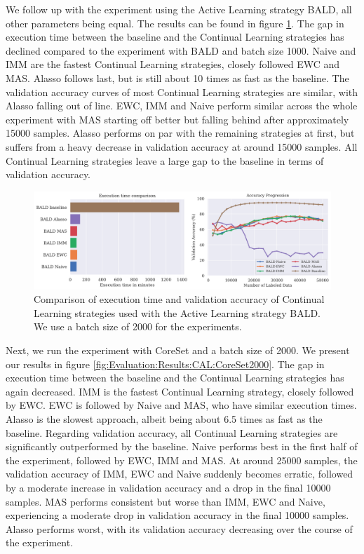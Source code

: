 We follow up with the experiment using the Active Learning strategy BALD, all other parameters being equal. The results can be found in figure \ref{fig:Evaluation:Results:CAL:BALD2000}. The gap in
execution time between the baseline and the Continual Learning strategies has declined compared to the experiment with BALD and batch size 1000. Naive and IMM are the fastest Continual Learning strategies,
closely followed EWC and MAS. Alasso follows last, but is still about 10 times as fast as the baseline. The validation accuracy curves of most Continual Learning strategies are similar, with Alasso falling 
out of line. EWC, IMM and Naive perform similar across the whole experiment with MAS starting off better but falling behind after approximately 15000 samples. Alasso performs on par with the remaining strategies
at first, but suffers from a heavy decrease in validation accuracy at around 15000 samples. All Continual Learning strategies leave a large gap to the baseline in terms of validation accuracy. \par

\begin{figure}[h]
    \centering
    \includegraphics[width=\linewidth]{images/results_CAL/Bald_CAL_2000b.png}
    \caption[Continual Active Learning BALD 2000 batch size]{Comparison of execution time and validation accuracy of Continual Learning strategies used with the Active Learning strategy
    BALD. We use a batch size of 2000 for the experiments.}
    \label{fig:Evaluation:Results:CAL:BALD2000}
\end{figure}

Next, we run the experiment with CoreSet and a batch size of 2000. We present our results in figure \ref{fig:Evaluation:Results:CAL:CoreSet2000}. The gap in execution time between the baseline and the
Continual Learning strategies has again decreased. IMM is the fastest Continual Learning strategy, closely followed by EWC. EWC is followed by Naive and MAS, who have similar execution times. Alasso is
the slowest approach, albeit being about 6.5 times as fast as the baseline. Regarding validation accuracy, all Continual Learning strategies are significantly outperformed by the baseline. Naive performs best
in the first half of the experiment, followed by EWC, IMM and MAS. At around 25000 samples, the validation accuracy of IMM, EWC and Naive suddenly becomes erratic, followed by a moderate increase in validation
accuracy and a drop in the final 10000 samples. MAS performs consistent but worse than IMM, EWC and Naive, experiencing a moderate drop in validation accuracy in the final 10000 samples. Alasso performs worst,
with its validation accuracy decreasing over the course of the experiment. \par

